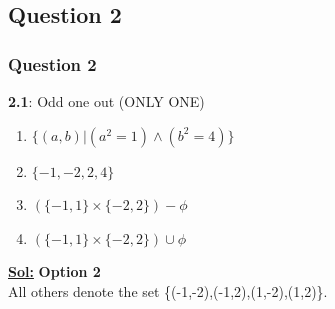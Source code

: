 \documentclass[xcolor=svgnames]{beamer}
\begin{document}
\subsection{Question 2}
\begin{frame}
\frametitle{Question 2}
\textbf{2.1}: Odd one out (ONLY ONE)
\begin{enumerate}
    \item $\{(a,b) | (a^2 = 1) \land (b^2 = 4)\}$
    \item $\{-1,-2,2,4\}$
    \item $(\{-1,1\} \times \{-2,2\}) - \phi$
    \item $(\{-1,1\} \times \{-2,2\}) \cup \phi$
\end{enumerate}
\textbf{\underline{Sol:}} \textbf{Option 2} \\
All others denote the set \{(-1,-2),(-1,2),(1,-2),(1,2)\}.
\end{frame}

\end{document}
